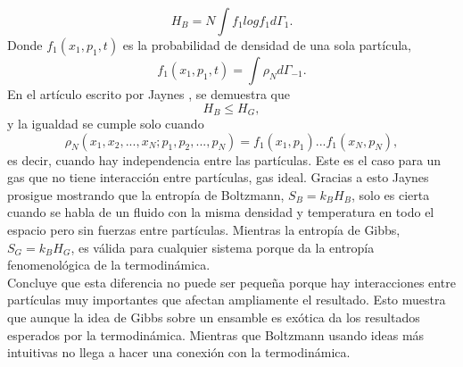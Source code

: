 \begin{equation}
H_{B}=N \int f_{1} log f_{1} d\Gamma_{1}.
\end{equation}
Donde $f_{1}(x_{1},p_{1},t)$ es la probabilidad de densidad de una sola partícula, 
\begin{equation}
f_{1}(x_{1},p_{1},t)= \int \rho_{N} d \Gamma_{-1}.
\end{equation}
En el artículo escrito por Jaynes \cite{JaynesEntropies}, se demuestra que
\begin{equation}
H_{B} \leq H_{G},
\end{equation}
y la igualdad se cumple solo cuando 
\begin{equation}
\rho_{N}(x_{1},x_{2},...,x_{N};p_{1},p_{2},...,p_{N})=f_{1}(x_{1},p_{1})...f_{1}(x_{N},p_{N}),
\end{equation}
es decir, cuando hay independencia entre las partículas. Este es el caso para un gas que no tiene interacción entre partículas, gas ideal. Gracias a esto Jaynes prosigue mostrando que la entropía de Boltzmann, $S_{B}=k_{B}H_{B}$, solo es cierta cuando se habla de un fluido con la misma densidad y temperatura en todo el espacio pero sin fuerzas entre partículas. Mientras la entropía de Gibbs, $S_{G}=k_{B}H_{G}$, es válida para cualquier sistema porque da la entropía fenomenológica de la termodinámica.
\\
Concluye que esta diferencia no puede ser pequeña porque hay interacciones entre partículas muy importantes que afectan ampliamente el resultado. Esto muestra que aunque la idea de Gibbs sobre un ensamble es exótica da los resultados esperados por la termodinámica. Mientras que Boltzmann usando ideas más intuitivas no llega a hacer una conexión con la termodinámica.

